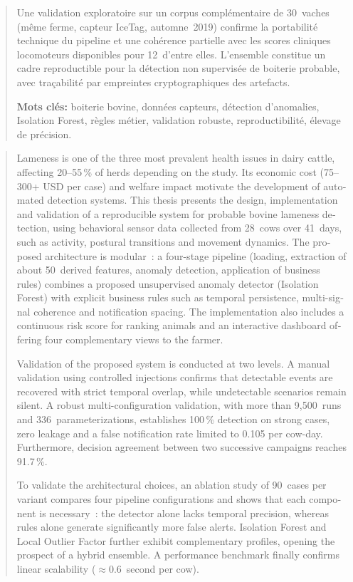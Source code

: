\begin{abstract}
Une validation exploratoire sur un corpus complémentaire de 30~vaches (même ferme,
capteur IceTag, automne~2019) confirme la portabilité technique du pipeline et une
cohérence partielle avec les scores cliniques locomoteurs disponibles pour 12~d'entre
elles. L'ensemble constitue un cadre reproductible pour la détection non supervisée de
boiterie probable, avec traçabilité par empreintes cryptographiques des artefacts.

\vspace{1em}
\textbf{Mots clés:} boiterie bovine, données capteurs, détection d'anomalies,
Isolation Forest, règles métier, validation robuste, reproductibilité, élevage de
précision.
\end{abstract}

\begin{otherlanguage}{english}
\renewcommand{\abstractname}{Abstract}
\begin{abstract}
Lameness is one of the three most prevalent health issues in dairy cattle, affecting
20--55\,\% of herds depending on the study. Its economic cost (75--300+ USD per case)
and welfare impact motivate the development of automated detection systems. This thesis
presents the design, implementation and validation of a reproducible system for probable
bovine lameness detection, using behavioral sensor data collected from 28~cows over
41~days, such as activity, postural transitions and movement dynamics. The proposed
architecture is modular~: a four-stage pipeline (loading, extraction of about
50~derived features, anomaly detection, application of business rules) combines a
proposed unsupervised anomaly detector (Isolation Forest) with explicit business rules
such as temporal persistence, multi-signal coherence and notification spacing. The
implementation also includes a continuous risk score for ranking animals and an
interactive dashboard offering four complementary views to the farmer.

Validation of the proposed system is conducted at two levels. A manual validation
using controlled injections confirms that detectable events are recovered with strict
temporal overlap, while undetectable scenarios remain silent. A robust
multi-configuration validation, with more than 9,500~runs and
336~parameterizations, establishes 100\,\% detection on strong cases, zero leakage
and a false notification rate limited to 0.105 per cow-day. Furthermore, decision
agreement between two successive campaigns reaches 91.7\,\%.

To validate the architectural choices, an ablation study of 90~cases per variant
compares four pipeline configurations and shows that each component is necessary~:
the detector alone lacks temporal precision, whereas rules alone generate significantly
more false alerts. Isolation Forest and Local Outlier Factor further exhibit
complementary profiles, opening the prospect of a hybrid ensemble. A performance
benchmark finally confirms linear scalability ($\approx$0.6~second per cow).


\end{abstract}
\end{otherlanguage}
